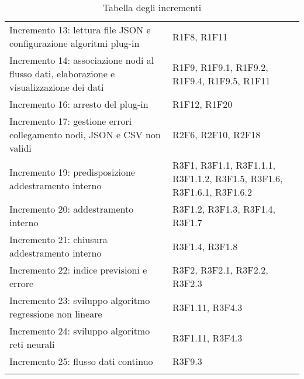 \begin{longtable} {
		>{\raggedright\arraybackslash}p{85mm}
		>{\raggedleft\arraybackslash}p{40mm}
	}
	Incremento 13: lettura file JSON e configurazione algoritmi plug-in &
	R1F8, R1F11 \TBstrut \\ [2mm]
	
	Incremento 14: associazione nodi al flusso dati, elaborazione e visualizzazione dei dati &
	R1F9, R1F9.1, R1F9.2, R1F9.4, R1F9.5, R1F11 \TBstrut \\ [2mm]
	
	Incremento 16: arresto del plug-in &
	R1F12, R1F20 \TBstrut \\ [2mm]
	
	Incremento 17: gestione errori collegamento nodi, JSON e CSV non validi &
	R2F6, R2F10, R2F18 \TBstrut \\ [2mm]
	
	Incremento 19: predisposizione addestramento interno &
	R3F1, R3F1.1, R3F1.1.1, R3F1.1.2, R3F1.5, R3F1.6, R3F1.6.1, R3F1.6.2 \TBstrut \\ [2mm]
	
	Incremento 20: addestramento interno &
	R3F1.2, R3F1.3, R3F1.4, R3F1.7 \TBstrut \\ [2mm]
	
	Incremento 21: chiusura addestramento interno &
	R3F1.4, R3F1.8 \TBstrut \\ [2mm]
	
	Incremento 22: indice previsioni e errore &
	R3F2, R3F2.1, R3F2.2, R3F2.3 \TBstrut \\ [2mm]
	
	Incremento 23: sviluppo algoritmo regressione non lineare &
	R3F1.11, R3F4.3 \TBstrut \\ [2mm]
	
	Incremento 24: sviluppo algoritmo reti neurali\glo &
	R3F1.11, R3F4.3 \TBstrut \\ [2mm]
	
	Incremento 25: flusso dati continuo &
	R3F9.3 \TBstrut \\ [2mm]
	\rowcolor{white}
	\caption{Tabella degli incrementi}
\end{longtable}


